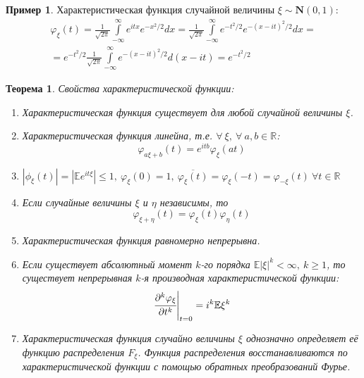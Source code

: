 \documentclass[oneside,final,14pt]{extreport}
\newtheorem{thm}{Теорема}[section]
\theoremstyle{definition}
\newtheorem*{exmp}{Пример}
\begin{document}
\begin{exmp}
    Характеристическая функция случайной величины $\xi \sim \mathbf{N}(0,1)$:
    \begin{multline*}
        \varphi_{\xi}(t) 
        = \frac{1}{\sqrt{2 \pi}} \int\limits_{-\infty}^{\infty} e^{i t x} e^{-x^{2} / 2} d x
        = \frac{1}{\sqrt{2 \pi}} \int\limits_{-\infty}^{\infty} e^{-t^{2} / 2} e^{-(x-i t)^{2} / 2} d x = \\ 
        = e^{-t^{2} / 2} \frac{1}{\sqrt{2 \pi}} \int\limits_{-\infty}^{\infty} e^{-(x-i t)^{2} / 2} d(x-i t)
        = e^{-t^{2} / 2}
    \end{multline*}
\end{exmp}

\begin{thm}
    Свойства характеристической функции:
    \begin{enumerate}
        \item Характеристическая функция существует для любой случайной величины $\xi$.
        \item Характеристическая функция линейна, т.е. $\forall~ \xi,~ \forall~ a, b \in \mathbb{R}$:
        \begin{equation*}
            \varphi_{a \xi + b}(t) = e^{itb} \varphi_{\xi}(at)
        \end{equation*}
        \item $|\phi_{\xi}(t)|=|\mathbb{E} e^{i t \xi}| \leqslant 1,~ \varphi_{\xi}(0) = 1, ~\overline{\varphi_{\xi}(t)} = \varphi_{\xi}(-t) = \varphi_{-\xi}(t) ~\forall t \in \mathbb{R}$
        \item Если случайные величины $\xi$ и $\eta$ независимы, то
        \begin{equation*}
            \varphi_{\xi + \eta}(t) = \varphi_{\xi}(t) \varphi_{\eta}(t)
        \end{equation*}
        \item Характеристическая функция равномерно непрерывна.
        \item Если существует абсолютный момент $k$-го порядка $\mathbb{E}|\xi|^{k} < \infty,~ k \geqslant 1$, то существует непрерывная $k$-я производная характеристической функции:
        \begin{equation*}
            \left.\cfrac{\partial^{k} \varphi_{\xi}}{\partial t^{k}}\right|_{t=0}= i^{k} \mathbb{E} \xi^{k}
        \end{equation*}
        \item Характеристическая функция случайно величины $\xi$ однозначно определяет её функцию распределения $F_{\xi}$. Функция распределения восстанавливаются по характеристической функции с помощью обратных преобразований Фурье.
        

\end{enumerate}
\end{thm}
\end{document}
